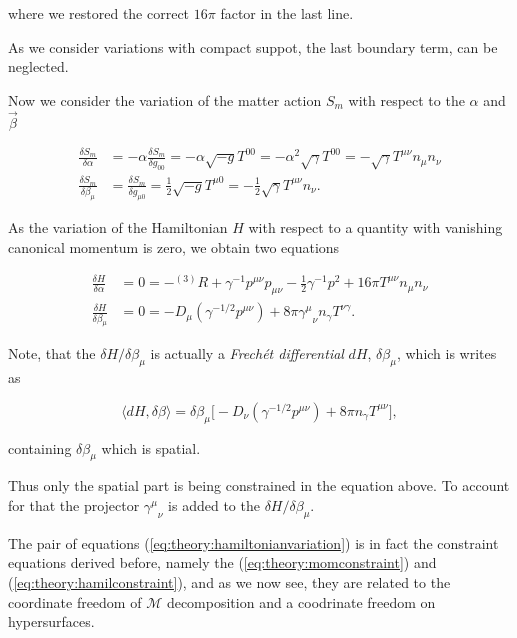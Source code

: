 {    where we restored the correct $16\pi$ factor in the last line.
    
    As we consider variations with compact suppot, the last boundary term, can be neglected.
    
    
    Now we consider the variation of the matter action $S_m$ with respect to the $\alpha$ and $\vec{\beta}$
    
    \begin{align}
    \frac{\delta S_m}{\delta \alpha} &=-\alpha\frac{\delta S_m}{\delta g_{00}} = -\alpha\sqrt{-g}T^{00} = -\alpha^2\sqrt{\gamma}T^{00} = -\sqrt{\gamma}T^{\mu\nu}n_{\mu}n_{\nu} \\
    \frac{\delta S_m}{\delta \beta_{\mu}} &= \frac{\delta S_m}{\delta g_{\mu 0}} =\frac{1}{2}\sqrt{-g}T^{\mu 0} = -\frac{1}{2} \sqrt{\gamma}T^{\mu\nu}n_{\nu}.
    \end{align}
    
    As the variation of the Hamiltonian $H$ with respect to a quantity with vanishing canonical momentum is zero, we obtain two equations 
    
    \begin{align}
    \frac{\delta H}{\delta \alpha} &= 0 = -{^{(3)}R} + \gamma^{-1}p^{\mu\nu}p_{\mu\nu}-\frac{1}{2}\gamma^{-1}p^2 + 16\pi T^{\mu\nu}n_{\mu}n_{\nu} \\
    \frac{\delta H}{\delta \beta_{\mu}} &= 0 = - D_{\mu}(\gamma^{-1/2}p^{\mu\nu}) + 8\pi{\gamma^{\mu}}_{\nu}n_{\gamma}T^{\nu\gamma}.
    \label{eq:theory:hamiltonianvariation}
    \end{align}
    
    Note, that the $\delta H / \delta\beta_{\mu}$ is actually a \textit{Frech\'et differential} $dH$, $\delta \beta_{\mu}$, which is writes as
    
    \begin{equation}
    \langle dH,\delta\beta \rangle = \delta\beta_{\mu}\big[-D_{\nu}(\gamma^{-1/2}p^{\mu\nu})+8\pi n_{\gamma}T^{\mu\nu}\big], 
    \end{equation}
    
    containing $\delta\beta_{\mu}$ which is spatial. 
    
    Thus only the spatial part is being constrained in the equation above. 
    To account for that the projector ${\gamma^{\mu}}_{\nu}$ is added to the $\delta H/\delta \beta_{\mu}$.
    
    The pair of equations (\ref{eq:theory:hamiltonianvariation}) is in fact the constraint equations derived before, namely the (\ref{eq:theory:momconstraint}) and (\ref{eq:theory:hamilconstraint}), and as we now see, they are related to the coordinate freedom of $\mathcal{M}$ decomposition and a coodrinate freedom on hypersurfaces.
    
}
